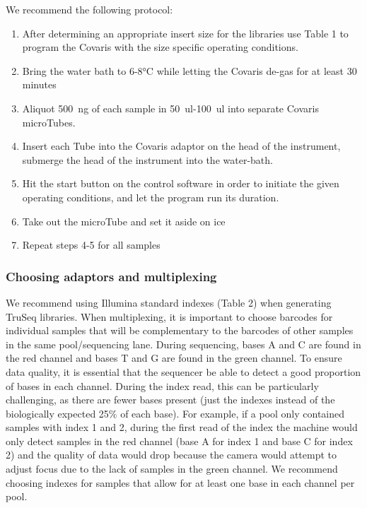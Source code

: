 \documentclass[graybox]{svmult}
\begin{document}
We recommend the following protocol:
\begin{enumerate}
\item{      After determining an appropriate insert size for the libraries use Table 1 to program the Covaris with the size specific operating conditions.}
\item{      Bring the water bath to 6-8°C while letting the Covaris de-gas for at least 30 minutes}
\item{      Aliquot 500~ng of each sample in 50~ul-100~ul into separate Covaris microTubes.}
\item{      Insert each Tube into the Covaris adaptor on the head of the instrument, submerge the head of the instrument into the water-bath.}
\item{      Hit the start button on the control software in order to initiate the given operating conditions, and let the program run its duration.}
\item{      Take out the microTube and set it aside on ice}
\item{      Repeat steps 4-5 for all samples}
\end{enumerate}

\subsubsection{Choosing adaptors and multiplexing}

We recommend using Illumina standard indexes (Table 2) when generating TruSeq libraries. When multiplexing, it is important to choose barcodes for individual samples that will be complementary to the barcodes of other samples in the same pool/sequencing lane. During sequencing, bases A and C are found in the red channel and bases T and G are found in the green channel. To ensure data quality, it is essential that the sequencer be able to detect a good proportion of bases in each channel. During the index read, this can be particularly challenging, as there are fewer bases present (just the indexes instead of the biologically expected 25\% of each base). For example, if a pool only contained samples with index 1 and 2, during the first read of the index the machine would only detect samples in the red channel (base A for index 1 and base C for index 2) and the quality of data would drop because the camera would attempt to adjust focus due to the lack of samples in the green channel. We recommend choosing indexes for samples that allow for at least one base in each channel per pool.
\end{document}
